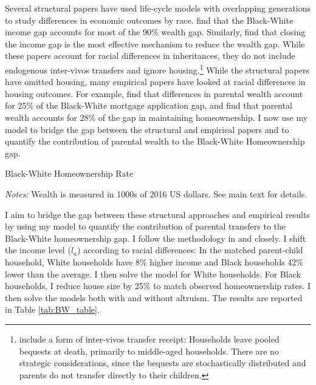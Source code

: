 \documentclass[12pt]{article}
\begin{document}
Several structural papers have used life-cycle models with overlapping generations to study differences in economic outcomes by race. \cite{Ashman2020} find that the Black-White income gap accounts for most of the 90\% wealth gap. Similarly, \cite{aliprantis2022dynamics} find that closing the income gap is the most effective mechanism to reduce the wealth gap. While these papers account for racial differences in inheritances, they do not include endogenous inter-vivos transfers and ignore housing.\footnote{\cite{aliprantis2022dynamics} include a form of inter-vivos transfer receipt: Households leave pooled bequests at death, primarily to middle-aged households. There are no strategic considerations, since the bequests are stochastically distributed and parents do not transfer directly to their children.} While the structural papers have omitted housing, many empirical papers have looked at racial differences in housing outcomes. For example, \cite{charles2002transition} find that differences in parental wealth account for 25\% of the Black-White mortgage application gap, and \cite{bond2021role} find that parental wealth accounts for 28\% of the gap in maintaining homeownership. I now use my model to bridge the gap between the structural and empirical papers and to quantify the contribution of parental wealth to the Black-White Homeownership gap.
\begin{table}
	\center
\begin{threeparttable}[tb]
				\singlespacing
		\caption{Black-White Homeownership Rate}\label{tab:BW_table}
		
		\footnotesize
		\textit{Notes:} Wealth is measured in 1000s of 2016 US dollars. See main text for details.
	\end{threeparttable}
\end{table}


I aim to bridge the gap between these structural approaches and empirical results by using my model to quantify the contribution of parental transfers to the Black-White homeownership gap. I follow the methodology in \cite{Ashman2020} and \cite{aliprantis2022dynamics} closely. I shift the income level ($l_a$) according to racial differences: In the matched parent-child household, White households have 8\% higher income and Black households 42\% lower than the average. I then solve the model for White households. For Black households, I reduce house size by 25\% to match observed homeownership rates. I then solve the models both with and without altruism. The results are reported in Table \ref{tab:BW_table}. 
\end{document}
